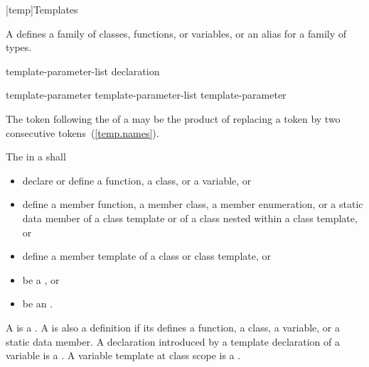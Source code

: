 [temp]{Templates}%


%

\pnum
A  defines a family of classes, functions, or variables, or an alias for a
family of types.

%
%
\begin{bnf}
\br
   template-parameter-list \terminal{>} declaration
\end{bnf}

\begin{bnf}
\br
  template-parameter\br
  template-parameter-list \terminal{,} template-parameter
\end{bnf}

\begin{note} The \tcode{>} token following the
 of a
may be the product of replacing a
\tcode{>{>}} token by two consecutive \tcode{>}
tokens~(\ref{temp.names}).\end{note}

The
in a
shall

\begin{itemize}
\item declare or define a function, a class, or a variable, or

\item define a member function, a member class, a member enumeration, or a static data member of a
class template or of a class nested within a class template, or

\item define a member template of a class or class template, or

\item be a , or

\item be an .
\end{itemize}

A  is a .
%
A  is also a definition
if its  defines a function, a class, a variable, or a
static data member. A declaration introduced by a template declaration of a
%
variable is a . A variable template at class scope is a
.

